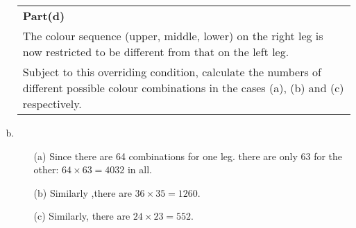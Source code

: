 \documentclass[a4paper,12pt]{article}
\begin{document}
\begin{enumerate}[(a)]
  \begin{table}[ht!]
     \centering
     \begin{tabular}{|p{15cm}|}
     \hline  
\noindent \textbf{Part(d)}\\ The colour sequence (upper, middle, lower) on the right leg is now restricted to be different from that on the left leg. \\ Subject to this overriding condition, calculate the numbers of different possible colour combinations in the cases (a), (b) and (c) respectively. 
 \\ \hline 
      \end{tabular}
    \end{table} 
    
    
\item 
\begin{itemize}
\item[(a)] Since there are 64 combinations for one leg. there are only 63 for the other:
$64 \times 63 = 4032$ in all.
\item[(b)] Similarly ,there are $36 \times 35 = 1260$.
\item[(c)] Similarly, there are $24 \times 23 = 552$.
\end{itemize}
\end{enumerate}
\end{document}
